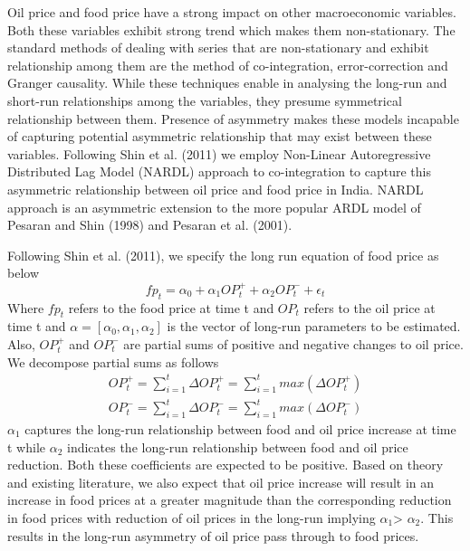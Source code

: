 \documentclass[a4paper,12pt]{article}
\begin{document}
Oil price and food price have a strong impact on other macroeconomic variables. Both these variables exhibit strong trend which makes them non-stationary.  The standard methods of dealing with series that are non-stationary and exhibit relationship among them are the method of co-integration, error-correction and Granger causality. While these techniques enable in analysing the long-run and short-run relationships among the variables, they presume symmetrical relationship between them. Presence of asymmetry makes these models incapable of capturing potential asymmetric relationship that may exist between these variables.  Following Shin et al. (2011) we employ Non-Linear Autoregressive Distributed Lag Model (NARDL) approach to co-integration to capture this asymmetric relationship between oil price and food price in India. NARDL approach is an asymmetric extension to the more popular ARDL model of Pesaran and Shin (1998) and Pesaran et al. (2001).

Following Shin et al. (2011), we specify the long run equation of food price as below
\begin{equation}
	fp_t=\alpha_0+\alpha_1OP_t^++\alpha_2OP_t^-+\epsilon_t
\end{equation}
Where $ fp_t $ refers to the food price at time t and  $ OP_t $ refers to the oil price at time t and $ \alpha= [\alpha_0,\alpha_1,\alpha_2] $ is the vector of long-run parameters to be estimated. Also, $  OP_t^+ $ and $OP_t^- $ are partial sums of positive and negative changes to oil price. 
We decompose partial sums as follows
\begin{subequations}
	\begin{align}
		OP_t^+ = \sum_{i=1}^{t}\Delta OP_t^+ =\sum_{i=1}^{t}max(\Delta OP_t^+) \\
		OP_t^- = \sum_{i=1}^{t}\Delta OP_t^- =\sum_{i=1}^{t}max(\Delta OP_t^-)
	\end{align}
\end{subequations}
$\alpha_1$ captures the long-run relationship between food and oil price increase at time t while $\alpha_2$ indicates the long-run relationship between food and oil price reduction. Both these coefficients are expected to be positive. Based on theory and existing literature, we also expect that oil price increase will result in an increase in food prices at a greater magnitude than the corresponding reduction in food prices with reduction of oil prices in the long-run implying $\alpha_1$> $\alpha_2$.  This results in the long-run asymmetry of oil price pass through to food prices. 
\end{document}
